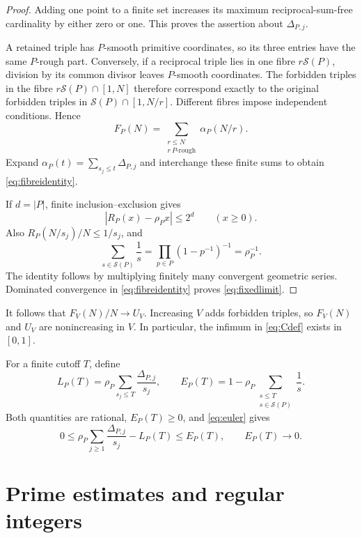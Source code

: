 \documentclass[11pt]{amsart}
\theoremstyle{definition}
\theoremstyle{remark}
\numberwithin{equation}{section}
\newcommand{\Sp}{\mathcal S}
\begin{document}
\begin{proof}
Adding one point to a finite set increases its maximum reciprocal-sum-free cardinality by either zero or one.
This proves the assertion about $\Delta_{P,j}$.

A retained triple has $P$-smooth primitive coordinates, so its three entries have the same $P$-rough part.
Conversely, if a reciprocal triple lies in one fibre $r\Sp(P)$, division by its common divisor leaves $P$-smooth coordinates.
The forbidden triples in the fibre $r\Sp(P)\cap[1,N]$ therefore correspond exactly to the original forbidden triples in $\Sp(P)\cap[1,N/r]$.
Different fibres impose independent conditions. Hence
\[
F_P(N)=\sum_{\substack{r\le N\\r\ P\text{-rough}}}\alpha_P(N/r).
\]
Expand $\alpha_P(t)=\sum_{s_j\le t}\Delta_{P,j}$ and interchange these finite sums to obtain \eqref{eq:fibreidentity}.

If $d=|P|$, finite inclusion--exclusion gives
\begin{equation}\label{eq:roughcount}
|R_P(x)-\rho_Px|\le2^d\qquad(x\ge0).
\end{equation}
Also $R_P(N/s_j)/N\le1/s_j$, and
\begin{equation}\label{eq:euler}
\sum_{s\in\Sp(P)}\frac1s=\prod_{p\in P}(1-p^{-1})^{-1}=\rho_P^{-1}.
\end{equation}
The identity follows by multiplying finitely many convergent geometric series.
Dominated convergence in \eqref{eq:fibreidentity} proves \eqref{eq:fixedlimit}.
\end{proof}

It follows that $F_V(N)/N\to U_V$.
Increasing $V$ adds forbidden triples, so $F_V(N)$ and $U_V$ are nonincreasing in $V$.
In particular, the infimum in \eqref{eq:Cdef} exists in $[0,1]$.

For a finite cutoff $T$, define
\begin{equation}\label{eq:prefix}
L_P(T)=\rho_P\sum_{s_j\le T}\frac{\Delta_{P,j}}{s_j},
\qquad
E_P(T)=1-\rho_P\sum_{\substack{s\le T\\s\in\Sp(P)}}\frac1s.
\end{equation}
Both quantities are rational, $E_P(T)\ge0$, and \eqref{eq:euler} gives
\begin{equation}\label{eq:prefixerror}
0\le \rho_P\sum_{j\ge1}\frac{\Delta_{P,j}}{s_j}-L_P(T)\le E_P(T),
\qquad E_P(T)\longrightarrow0.
\end{equation}

\section{Prime estimates and regular integers}\label{sec:regular}
\end{document}
